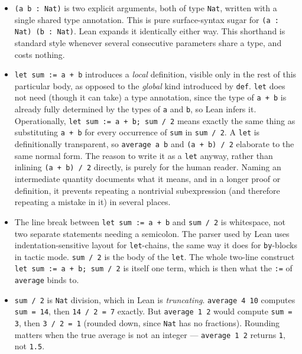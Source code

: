 \begin{itemize}
\tightlist
\item
  \texttt{(a b : Nat)} is two explicit arguments, both of type \texttt{Nat}, written with a single shared type annotation. This is pure surface-syntax sugar for \texttt{(a : Nat) (b : Nat)}. Lean expands it identically either way. This shorthand is standard style whenever several consecutive parameters share a type, and costs nothing.
\item
  \texttt{let sum := a + b} introduces a \emph{local} definition, visible only in the rest of this particular body, as opposed to the \emph{global} kind introduced by \texttt{def}. \texttt{let} does not need (though it can take) a type annotation, since the type of \texttt{a + b} is already fully determined by the types of \texttt{a} and \texttt{b}, so Lean infers it. Operationally, \texttt{let sum := a + b; sum /\allowbreak{} 2} means exactly the same thing as substituting \texttt{a + b} for every occurrence of \texttt{sum} in \texttt{sum /\allowbreak{} 2}. A \texttt{let} is definitionally transparent, so \texttt{average a b} and \texttt{(a + b) /\allowbreak{} 2} elaborate to the same normal form. The reason to write it as a \texttt{let} anyway, rather than inlining \texttt{(a + b) /\allowbreak{} 2} directly, is purely for the human reader. Naming an intermediate quantity documents what it means, and in a longer proof or definition, it prevents repeating a nontrivial subexpression (and therefore repeating a mistake in it) in several places.
\item
  The line break between \texttt{let sum := a + b} and \texttt{sum /\allowbreak{} 2} is whitespace, not two separate statements needing a semicolon. The parser used by Lean uses indentation-sensitive layout for \texttt{let}-chains, the same way it does for \texttt{by}-blocks in tactic mode. \texttt{sum /\allowbreak{} 2} is the body of the \texttt{let}. The whole two-line construct \texttt{let sum := a + b; sum /\allowbreak{} 2} is itself one term, which is then what the \texttt{:=} of \texttt{average} binds to.
\item
  \texttt{sum /\allowbreak{} 2} is \texttt{Nat} division, which in Lean is \emph{truncating}. \texttt{average 4 10} computes \texttt{sum = 14}, then \texttt{14 /\allowbreak{} 2 = 7} exactly. But \texttt{average 1 2} would compute \texttt{sum = 3}, then \texttt{3 /\allowbreak{} 2 = 1} (rounded down, since \texttt{Nat} has no fractions). Rounding matters when the true average is not an integer --- \texttt{average 1 2} returns \texttt{1}, not \texttt{1.5}.
\end{itemize}

